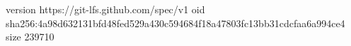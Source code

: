 version https://git-lfs.github.com/spec/v1
oid sha256:4a98d632131bfd48fed529a430c594684f18a47803fc13bb31cdcfaa6a994ce4
size 239710
